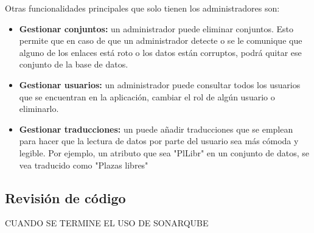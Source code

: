 Otras funcionalidades principales que solo tienen los administradores son:
\begin{itemize}
    \item \textbf{Gestionar conjuntos:} un administrador puede eliminar conjuntos. Esto permite que en caso de que un administrador detecte o se le comunique que alguno de los enlaces está roto o los datos están corruptos, podrá quitar ese conjunto de la base de datos.
    \item \textbf{Gestionar usuarios:} un administrador puede consultar todos los usuarios que se encuentran en la aplicación, cambiar el rol de algún usuario o eliminarlo.
    \item \textbf{Gestionar traducciones:} un puede añadir traducciones que se emplean para hacer que la lectura de datos por parte del usuario sea más cómoda y legible. Por ejemplo, un atributo que sea "PlLibr" en un conjunto de datos, se vea traducido como "Plazas libres"
\end{itemize}

\subsection{Revisión de código}
CUANDO SE TERMINE EL USO DE SONARQUBE

\begin{comment}

Este apartado pretende recoger los aspectos más interesantes del desarrollo del proyecto, comentados por los autores del mismo.
Debe incluir desde la exposición del ciclo de vida utilizado, hasta los detalles de mayor relevancia de las fases de análisis, diseño e implementación.
Se busca que no sea una mera operación de copiar y pegar diagramas y extractos del código fuente, sino que realmente se justifiquen los caminos de solución que se han tomado, especialmente aquellos que no sean triviales.
Puede ser el lugar más adecuado para documentar los aspectos más interesantes del diseño y de la implementación, con un mayor hincapié en aspectos tales como el tipo de arquitectura elegido, los índices de las tablas de la base de datos, normalización y desnormalización, distribución en ficheros3, reglas de negocio dentro de las bases de datos (EDVHV GH GDWRV DFWLYDV), aspectos de desarrollo relacionados con el WWW...
Este apartado, debe convertirse en el resumen de la experiencia práctica del proyecto, y por sí mismo justifica que la memoria se convierta en un documento útil, fuente de referencia para los autores, los tutores y futuros alumnos.
\end{comment}